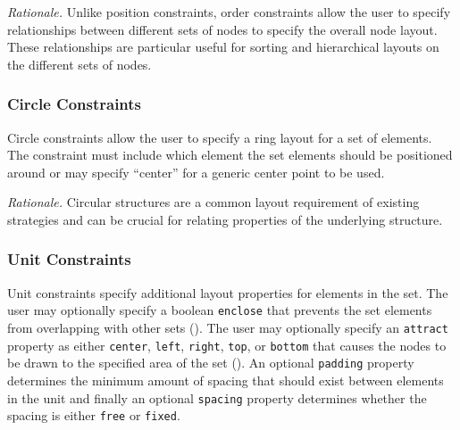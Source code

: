 
\emph{Rationale.} Unlike position constraints, order constraints allow the
user to specify relationships between different sets of nodes to specify
the overall node layout. These relationships are particular useful for
sorting and hierarchical layouts on the different sets of nodes.

\subsubsection{Circle Constraints}
 Circle
constraints allow the user to specify a ring layout for a set of
elements. The constraint must include which element the set elements should
be positioned around or may specify ``center'' for a generic center point
to be used.


\emph{Rationale.} Circular structures are a common layout requirement of
existing strategies  and can be crucial for relating
properties of the underlying structure.

\subsubsection{Unit Constraints}
 Unit constraints specify additional layout
properties for elements in the set. The user may optionally specify a
boolean \texttt{enclose} that prevents the set elements from overlapping
with other sets (). The user may optionally specify an
\texttt{attract} property as either \texttt{center}, \texttt{left},
\texttt{right}, \texttt{top}, or \texttt{bottom} that causes the nodes to
be drawn to the specified area of the set (). An optional
\texttt{padding} property determines the minimum amount of spacing that
should exist between elements in the unit and finally an optional
\texttt{spacing} property determines whether the spacing is either
\texttt{free} or \texttt{fixed}.



